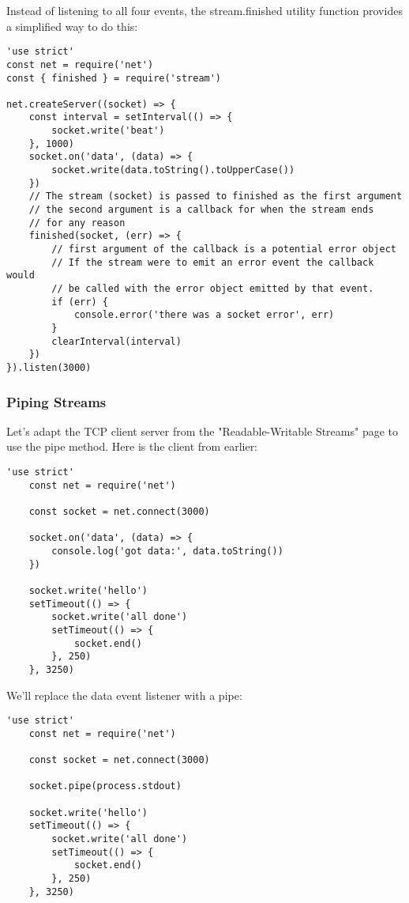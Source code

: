 \documentclass{scrartcl}
\begin{document}
Instead of listening to all four events, the stream.finished utility function provides a simplified way to do this:

\begin{lstlisting}[style=ES6]
'use strict'
const net = require('net')
const { finished } = require('stream')

net.createServer((socket) => {
    const interval = setInterval(() => {
        socket.write('beat')
    }, 1000)
    socket.on('data', (data) => {
        socket.write(data.toString().toUpperCase())
    })
    // The stream (socket) is passed to finished as the first argument
    // the second argument is a callback for when the stream ends
    // for any reason
    finished(socket, (err) => {
        // first argument of the callback is a potential error object
        // If the stream were to emit an error event the callback would
        // be called with the error object emitted by that event.
        if (err) {
            console.error('there was a socket error', err)
        }
        clearInterval(interval)
    })
}).listen(3000)

\end{lstlisting}

\subsubsection{Piping Streams}

Let's adapt the TCP client server from the "Readable-Writable Streams" page to use the pipe method. Here is the client from earlier:

\begin{lstlisting}[style=ES6]
    'use strict'
    const net = require('net')

    const socket = net.connect(3000)

    socket.on('data', (data) => {
        console.log('got data:', data.toString())
    })

    socket.write('hello')
    setTimeout(() => {
        socket.write('all done')
        setTimeout(() => {
            socket.end()
        }, 250)
    }, 3250)
\end{lstlisting}

We'll replace the data event listener with a pipe:

\begin{lstlisting}[style=ES6]
    'use strict'
    const net = require('net')

    const socket = net.connect(3000)

    socket.pipe(process.stdout)

    socket.write('hello')
    setTimeout(() => {
        socket.write('all done')
        setTimeout(() => {
            socket.end()
        }, 250)
    }, 3250)
\end{lstlisting}
\end{document}
